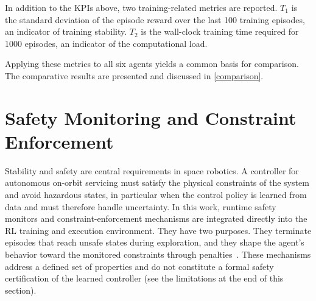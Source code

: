 \documentclass{ieeeaccess}
\begin{document}
In addition to the KPIs above, two training-related metrics are reported. $T_1$ is the standard deviation
of the episode reward over the last 100 training episodes, an indicator of training stability. $T_2$ is
the wall-clock training time required for 1000 episodes, an indicator of the computational load.

Applying these metrics to all six agents yields a common basis for comparison. The
comparative results are presented and discussed in \cref{comparison}.

\section{Safety Monitoring and Constraint Enforcement}\label{formal}
Stability and safety are central requirements in space robotics. A controller for autonomous on-orbit
servicing must satisfy the physical constraints of the system and avoid hazardous states, in
particular when the control policy is learned from data and must therefore handle uncertainty.
In this work, runtime safety monitors and constraint-enforcement mechanisms are integrated directly into the
RL training and execution environment. They have two purposes. They terminate episodes that reach unsafe states
during exploration, and they shape the agent's behavior toward the monitored constraints through
penalties~\cite{b7,b22}. These mechanisms address a defined set of properties and do not constitute a
formal safety certification of the learned controller (see the limitations at the end of this section).
\end{document}
